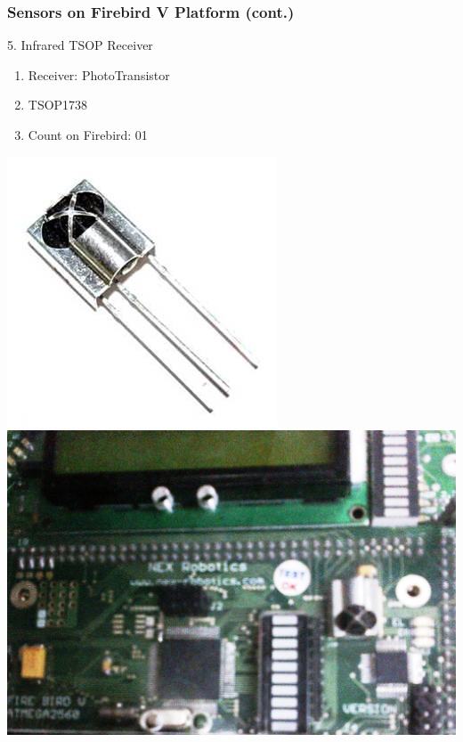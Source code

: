 \documentclass[10pt,red]{beamer}
\begin{document}
\begin{frame}
	\frametitle{Sensors on Firebird V Platform (cont.)} 
	5. Infrared TSOP Receiver	\pause
		\vfill
		\begin{minipage}[c]{0.5\textwidth}
			\begin{enumerate}
				\item <+-|alert@+> Receiver: PhotoTransistor \\[10pt]
				\item <+-|alert@+> TSOP1738 \\[10pt]
				\item <+-|alert@+> Count on Firebird: 01 \\[10pt]
			\end{enumerate}
		\end{minipage}
		\hfill
		\begin{minipage}[c]{0.4\textwidth}
			\includegraphics[width=0.6\linewidth]{tsop_receiver} \\[10pt]
		\vfill
			\includegraphics[width=0.6\linewidth]{tsop_on_fb}
		\end{minipage}	
\end{frame}	
\end{document}
